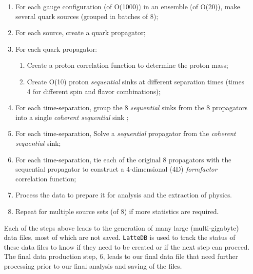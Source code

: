 \begin{enumerate}
\def\labelenumi{\arabic{enumi}.}
\tightlist
\item
  For each gauge configuration (of O(1000)) in an ensemble (of O(20)),
  make several quark sources (grouped in batches of 8);
\item
  For each source, create a quark propagator;
\item
  For each quark propagator:

  \begin{enumerate}
  \def\labelenumii{\arabic{enumii}.}
  \tightlist
  \item
    Create a proton correlation function to determine the proton mass;
  \item
    Create O(10) proton \emph{sequential} sinks at different separation
    times (times 4 for different spin and flavor combinations);
  \end{enumerate}
\item
  For each time-separation, group the 8 \emph{sequential} sinks from the
  8 propagators into a single \emph{coherent sequential} sink
  \cite{Bratt:2010jn};
\item
  For each time-separation, Solve a \emph{sequential} propagator from
  the \emph{coherent sequential} sink;
\item
  For each time-separation, tie each of the original 8 propagators with
  the sequential propagator to construct a 4-dimensional (4D)
  \emph{formfactor} correlation function;
\item
  Process the data to prepare it for analysis and the extraction of
  physics.
\item
  Repeat for multiple source sets (of 8) if more statistics are
  required.
\end{enumerate}

Each of the steps above leads to the generation of many large
(multi-gigabyte) data files, most of which are not saved.
\texttt{LatteDB} is used to track the status of these data files to know
if they need to be created or if the next step can proceed. The final
data production step, 6, leads to our final data file that need further
processing prior to our final analysis and saving of the files.

